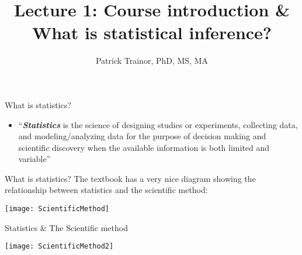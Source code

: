 \documentclass[xcolor=dvipsnames]{beamer}
\title[Lecture 1]{Lecture 1: Course introduction \& What is statistical inference?}
\author[Patrick Trainor]{Patrick Trainor, PhD, MS, MA}
\institute[NMSU]{New Mexico State University}
\date{}
\begin{document}
	
\begin{frame}
    \maketitle
\end{frame}

\begin{frame}{What is statistics?}
	\begin{itemize}
		\item ``\textbf{\textit{Statistics}} is the science of designing studies or experiments, collecting data, and modeling/analyzing data for the purpose of decision making and scientific discovery when the available information is both limited and variable''
	\end{itemize}
\end{frame}

\begin{frame}{What is statistics?}
	\vspace{-12pt}
	The textbook has a very nice diagram showing the relationship between statistics and the scientific method: \vspace{5pt}
	
	\begin{center}
		\texttt{[image: ScientificMethod]}
	\end{center}
\end{frame}

\begin{frame}{Statistics \& The Scientific method}
	\vspace{-12pt}
	\begin{center}
		\texttt{[image: ScientificMethod2]}
	\end{center}
\end{frame}
\end{document}
